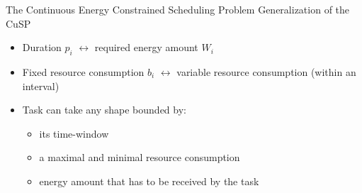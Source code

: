 \begin{frame}{The Continuous Energy Constrained Scheduling Problem }
   Generalization of the CuSP
   \begin{itemize}
     \vfill
   \item Duration $p_i$ $\leftrightarrow$ required energy amount $W_i$
     \vfill
   \item Fixed resource consumption $b_i$ $\leftrightarrow$ variable resource consumption (within an interval)
     \vfill  
   \item Task can take any shape bounded by:
     \begin{itemize}
     \item<2-> its time-window
     \item<3-> a maximal and minimal resource consumption
     \item<4-> energy amount that has to be received by the task
     \end{itemize}
     \vfill
   \end{itemize}
   \begin{overlayarea}{\textwidth}{3cm}
      {
       \vfill
       \begin{columns}
         \begin{column}{0.45\linewidth}
           
         \end{column}
         \begin{column}{0.45\linewidth}
           
         \end{column}
       \end{columns}
       \vfill}
   \end{overlayarea}
 \end{frame}
 
